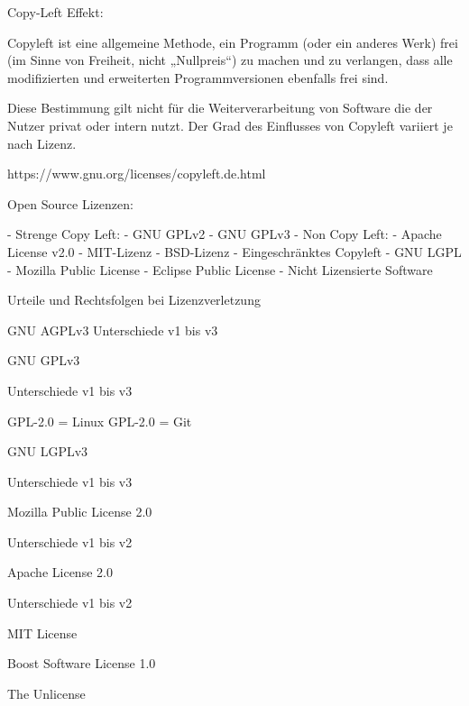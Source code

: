 \documentclass{beamer}
\begin{document}
Copy-Left Effekt:

Copyleft ist eine allgemeine Methode, ein Programm (oder ein anderes Werk) frei
(im Sinne von Freiheit, nicht „Nullpreis“) zu machen und zu verlangen, dass
alle modifizierten und erweiterten Programmversionen ebenfalls frei sind.

Diese Bestimmung gilt nicht für die Weiterverarbeitung von Software die der
Nutzer privat oder intern nutzt. Der Grad des Einflusses von Copyleft variiert
je nach Lizenz.

https://www.gnu.org/licenses/copyleft.de.html

Open Source Lizenzen:

- Strenge Copy Left:
  - GNU GPLv2
  - GNU GPLv3
- Non Copy Left:
  - Apache License v2.0
  - MIT-Lizenz
  - BSD-Lizenz
- Eingeschränktes Copyleft
  - GNU LGPL
  - Mozilla Public License
  - Eclipse Public License
- Nicht Lizensierte Software

Urteile und Rechtsfolgen bei Lizenzverletzung























\begin{frame}
	\Large{GNU AGPLv3}
	Unterschiede v1 bis v3
\end{frame}

\begin{frame}
	\Large{GNU GPLv3}

	Unterschiede v1 bis v3

	GPL-2.0 = Linux
	GPL-2.0 = Git
\end{frame}

\begin{frame}
	\Large{GNU LGPLv3}

	Unterschiede v1 bis v3
\end{frame}

\begin{frame}
	\Large{Mozilla Public License 2.0}

	Unterschiede v1 bis v2
\end{frame}

\begin{frame}
	\Large{Apache License 2.0}

	Unterschiede v1 bis v2
\end{frame}

\begin{frame}
	\Large{MIT License}
\end{frame}

\begin{frame}
	\Large{Boost Software License 1.0}
\end{frame}

\begin{frame}
	\Large{The Unlicense}
\end{frame}
\end{document}
